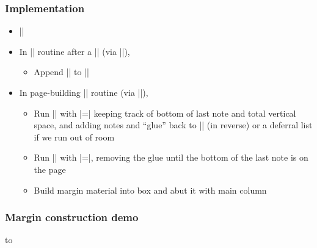 \documentclass{beamer}
\begin{document}
\begin{frame}[fragile]
  \frametitle{Implementation}
  \begin{itemize}
  \item |\newtoks\marginlist|
    \vskip0.5pc
  \item In |\output| routine after a |\marginpar| {\small(via |\@addmarginpar|)},
    \vskip-0.35pc
    \begin{itemize}
    \item Append |\note{\BOX}{\@pageht}| to |\marginlist|
    \end{itemize}
    \vskip0.5pc
  \item In page-building |\output| routine {\small(via |\@combinefloats|)},
    \begin{itemize}
    \item Run |\marginlist| with |\note=\note@down| keeping track of
      bottom of last note and total vertical space, and adding notes
      and ``glue'' back to |\marginlist| (in reverse) or a deferral
      list if we run out of room
    \item Run |\marginlist| with |\note=\note@up|, removing the glue
      until the bottom of the last note is on the page
    \item Build margin material into box and abut it with main column
    \end{itemize}
  \end{itemize}
\end{frame}

\begin{frame}
  \frametitle{Margin construction demo}
  \hbox to \textwidth{\hfill\Huge$\Leftarrow$\hfill}
\end{frame}

\end{document}
